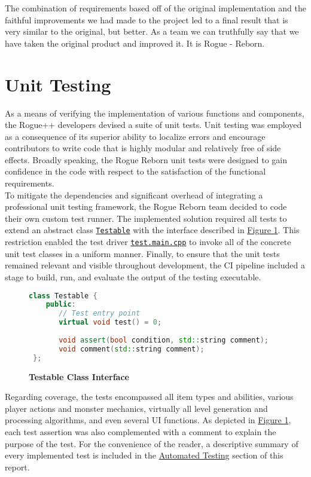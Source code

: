 \documentclass[12pt, titlepage]{article}
\newcommand{\newsection}[1]{\newpage\section{#1}}
\begin{document}
	The combination of requirements based off of the original implementation and the faithful improvements we had made to the project led to a final result that is very similar to the original, but better. As a team we can truthfully say that we have taken the original product and improved it. It is Rogue - Reborn.

\newsection{Unit Testing} \label{Section_UT}
	As a means of verifying the implementation of various functions and components, the Rogue++ developers devised a suite of unit tests.  Unit testing was employed as a consequence of its superior ability to localize errors and encourage contributors to write code that is highly modular and relatively free of side effects.  Broadly speaking, the Rogue Reborn unit tests were designed to gain confidence in the code with respect to the satisfaction of the functional requirements.\\

	To mitigate the dependencies and significant overhead of integrating a professional unit testing framework, the Rogue Reborn team decided to code their own custom test runner.  The implemented solution required all tests to extend an abstract class \href{run:../../src/test.testable.h}{\lstinline$Testable$} with the interface described in \hyperref[Figure_Testable]{Figure 1}.  This restriction enabled the test driver \href{run:../../src/test.main.cpp}{\lstinline$test.main.cpp$} to invoke all of the concrete unit test classes in a uniform manner.  Finally, to ensure that the unit tests remained relevant and visible throughout development, the CI pipeline included a stage to build, run, and evaluate the output of the testing executable.

	\begin{figure}[H] \label{Figure_Testable}
		\caption{\bf Testable Class Interface}
		\centering
		\begin{lstlisting}[language=C++]
 class Testable {
    public:
       // Test entry point
       virtual void test() = 0;
            
       void assert(bool condition, std::string comment);
       void comment(std::string comment);
 };
		\end{lstlisting}
	\end{figure} 

	Regarding coverage, the tests encompassed all item types and abilities, various player actions and monster mechanics, virtually all level generation and processing algorithms, and even several UI functions.  As depicted in \hyperref[Figure_Testable]{Figure 1}, each test assertion was also complemented with a comment to explain the purpose of the test.  For the convenience of the reader, a descriptive summary of every implemented test is included in the \hyperref[Section_Automated]{Automated Testing} section of this report.\\
\end{document}
